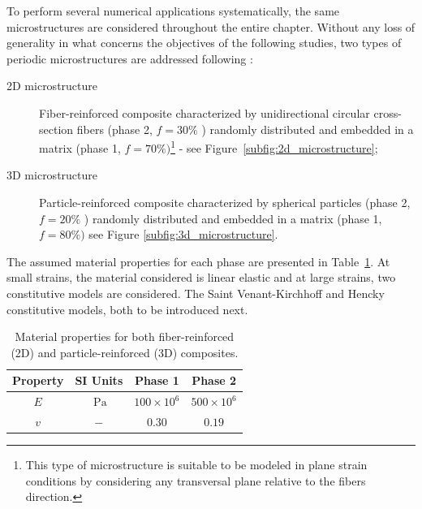 To perform several numerical applications systematically, the same microstructures are considered throughout the entire chapter.
Without any loss of generality in what concerns the objectives of the following studies, two types of periodic microstructures are addressed following \cite{ferreira_accurate_2020}:

\begin{description}
  \item[2D microstructure] Fiber-reinforced composite characterized by unidirectional circular cross-section fibers (phase 2, \(f=30 \%\) ) randomly distributed and embedded in a matrix (phase 1, \(f=70 \%)\)\footnote{This type of microstructure is suitable to be modeled in plane strain conditions by considering any transversal plane
relative to the fibers direction.} - see Figure~\ref{subfig:2d_microstructure};

  \item[3D microstructure] Particle-reinforced composite characterized by spherical particles (phase 2, \(f=20 \%\) ) randomly distributed and embedded in a matrix (phase 1, \(f=80 \%)\) see Figure \ref{subfig:3d_microstructure}.
\end{description}

The assumed material properties for each phase are presented in Table~\ref{tab:mat_properties}.
At small strains, the material considered is linear elastic and at large strains, two constitutive models are considered.
The Saint Venant-Kirchhoff and Hencky constitutive models, both to be introduced next.

\begin{table}[htbp]
  \caption{Material properties for both fiber-reinforced (2D) and particle-reinforced (3D) composites.}
\label{tab:mat_properties}
  \centering
  \begin{tabular}{cccc}
  \vphantom{\Big |}Property & SI Units & Phase 1 & Phase 2 \\
  \hline\hline \vphantom{\Big |}\(E\) & \(\mathrm{~Pa}\) & \(100 \times 10^{6}\) & \(500 \times 10^{6}\) \\
  \(v\) & \(-\) & \(0.30\) & \(0.19\) \\
  \hline\hline
  \end{tabular}
\end{table}

